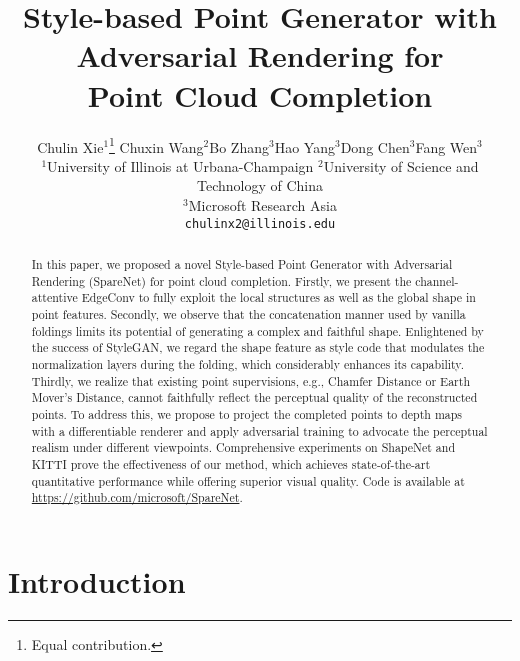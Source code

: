 \documentclass[final]{cvpr}
\newcommand*\samethanks[1][\value{footnote}]{\footnotemark[#1]}
\begin{document}
\title{Style-based Point Generator with Adversarial Rendering for \\Point Cloud Completion}

\author{Chulin Xie$^{1}$\thanks{Equal contribution.}  \qquad Chuxin Wang$^{2}$\samethanks \qquad Bo Zhang$^3$\qquad Hao Yang$^3$\qquad Dong Chen$^3$\qquad Fang Wen$^3$ \\ 
$^1$University of Illinois at Urbana-Champaign  \qquad $^2$University of Science and Technology of China \qquad \\ $^3$Microsoft Research Asia\\
{\tt\small chulinx2@illinois.edu}    
}

\maketitle

\begin{abstract}





In this paper, we proposed a novel Style-based Point Generator with Adversarial Rendering (SpareNet) for point cloud completion. 
Firstly, we present the channel-attentive EdgeConv to fully exploit the local structures as well as the global shape in point features. 
Secondly, we observe that the concatenation manner used by vanilla foldings limits its potential of generating a complex and faithful shape. Enlightened by the success of StyleGAN, we regard the shape feature as style code that modulates the normalization layers during the folding, which considerably enhances its capability. 
Thirdly, we realize that existing point supervisions, e.g., Chamfer Distance or Earth Mover's Distance, cannot faithfully reflect the perceptual quality of the reconstructed points. To address this, we propose to project the completed points to depth maps with a differentiable renderer and apply adversarial training to advocate the perceptual realism under different viewpoints. Comprehensive experiments on ShapeNet and KITTI prove the effectiveness of our method, which achieves state-of-the-art quantitative performance while offering superior visual quality. Code is available at \href{https://github.com/microsoft/SpareNet}{https://github.com/microsoft/SpareNet}.  

\end{abstract}

\section{Introduction}
\end{document}
